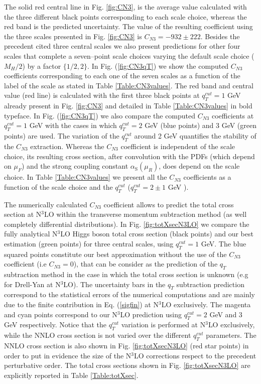 \documentclass[12pt]{article}
\newcommand\as{\alpha_{\mathrm{S}}}
\def\qt{q_T}
\begin{document}
The solid red central line in Fig. \ref{fig:CN3}, is the average value calculated with the three different black points corresponding to each scale choice, whereas the red band is the predicted uncertainty. The value of the resulting coefficient using the three scales presented in Fig. \ref{fig:CN3} is $C_{N3}=-932 \pm 222$.  Besides the precedent cited three central scales we also present predictions for other four scales that complete a seven--point scale choices varying the default scale choice ($M_{H}/2$) by a factor $\{1/2,2\}$.  In Fig. (\ref{fig:CN3qT}) we show the computed $C_{N3}$ coefficients corresponding to each one of the seven scales as a function of the label of the scale as stated in Table \ref{Table:CN3values}. The red band and central value (red line) is calculated with the first three black points at $q^{cut}_{T}=1$ GeV already present in Fig. \ref{fig:CN3} and detailed in Table \ref{Table:CN3values} in bold typeface.  In Fig. (\ref{fig:CN3qT}) we also compare the  computed $C_{N3}$ coefficients at $q^{cut}_{T}=1$ GeV with the cases in which $q^{cut}_{T}=2$ GeV (blue points) and 3 GeV (green points) are used. The variation of the $q^{cut}_{T}$ around 2 GeV quantifies the stability of the $C_{N3}$ extraction. Whereas the $C_{N3}$ coefficient is independent of the scale choice, its resulting cross section, after convolution with the PDFs (which depend on $\mu_{F}$) and the strong coupling constant $\as(\mu_{R})$, does depend on the scale choice. In Table \ref{Table:CN3values} we present all the $C_{N3}$ coefficients as a function of the scale choice and the $q^{cut}_{T}$ ($q^{cut}_{T} = 2 \pm 1$ GeV ).
 
The numerically calculated $C_{N3}$ coefficient allows to predict the total cross section at N$^{3}$LO within the transverse momentum subtraction method (as well completely differential distributions). In Fig. \ref{fig:totXsecN3LO} we compare the fully analytical N$^{3}$LO Higgs boson total cross section \cite{Mistlberger:2018etf} (black points) and our best estimation (green points) for three central scales, using $q^{cut}_{T}=1$ GeV. The blue squared points constitute our best approximation without the use of the $C_{N3}$ coefficient (i.e $C_{N3}=0$), that can be consider as the prediction of the $\qt$ subtraction method in the case in which the total cross section is unknown (e.g for Drell-Yan at N$^{3}$LO). The uncertainty bars in the $\qt$ subtraction prediction correspond to the statistical errors of the numerical computations and are mainly due to the finite contribution in Eq. (\ref{sigfin}) at N$^{3}$LO exclusively. The magenta and cyan points correspond to our N$^{3}$LO prediction using $q^{cut}_{T}=2$ GeV and 3 GeV respectively. Notice that the $q^{cut}_{T}$ variation is performed at N$^{3}$LO exclusively, while the NNLO cross section is not varied over the different $q^{cut}_{T}$ parameters.
The NNLO cross section is also shown in Fig. \ref{fig:totXsecN3LO} (red star points) in order to put in evidence the size of the N$^{3}$LO corrections respect to the precedent perturbative order. The total cross sections shown in Fig. \ref{fig:totXsecN3LO} are explicitly reported in Table \ref{Table:totXsec}.
\end{document}
